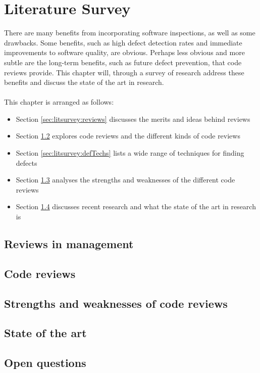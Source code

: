 \chapter{Literature Survey} \label{chapter:litsurvey}

There are many benefits from incorporating software inspections, as well as
some drawbacks.
Some benefits, such as high defect detection rates and immediate improvements to software quality, are
obvious.
Perhaps less obvious and more subtle are the long-term benefits, such as future
defect prevention, that code reviews provide.
This chapter will, through a survey of research address these benefits and discuss the state of the
art in research.\\
\\
This chapter is arranged as follows:
\begin{itemize}
	\item Section \ref{sec:litsurvey:reviews} discusses the merits and ideas behind reviews
	\item Section \ref{sec:litsurvey:codeRev} explores code reviews and the different kinds of code
		reviews
	\item Section \ref{sec:litsurvey:defTechs} lists a wide range of techniques for finding defects
	\item Section \ref{sec:litsurvey:strWeak} analyses the strengths and weaknesses of the different
		code reviews
	\item Section \ref{sec:litsurvey:current} discusses recent research and what the state of the art
		in research is
\end{itemize}

\section{Reviews in management} \label{sec:defects:reviews}

\section{Code reviews} \label{sec:litsurvey:codeRev}

\section{Strengths and weaknesses of code reviews} \label{sec:litsurvey:strWeak}

\section{State of the art} \label{sec:litsurvey:current}

\section{Open questions}
